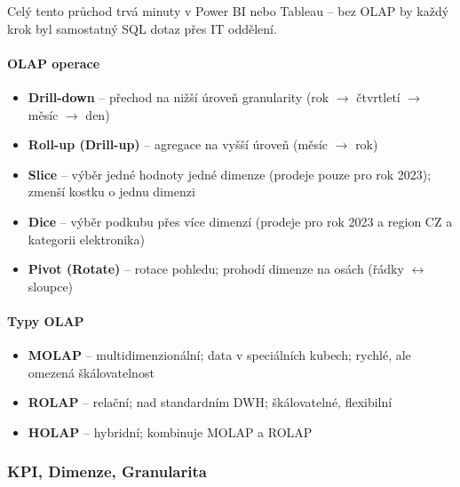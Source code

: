 Celý tento průchod trvá minuty v Power BI nebo Tableau -- bez OLAP by každý krok byl
samostatný SQL dotaz přes IT oddělení.

\paragraph{OLAP operace}
\begin{itemize}
  \item \textbf{Drill-down} -- přechod na nižší úroveň granularity (rok $\to$ čtvrtletí $\to$ měsíc $\to$ den)
  \item \textbf{Roll-up (Drill-up)} -- agregace na vyšší úroveň (měsíc $\to$ rok)
  \item \textbf{Slice} -- výběr jedné hodnoty jedné dimenze (prodeje pouze pro rok 2023); zmenší kostku o jednu dimenzi
  \item \textbf{Dice} -- výběr podkubu přes více dimenzí (prodeje pro rok 2023 a region CZ a kategorii elektronika)
  \item \textbf{Pivot (Rotate)} -- rotace pohledu; prohodí dimenze na osách (řádky $\leftrightarrow$ sloupce)
\end{itemize}

\paragraph{Typy OLAP}
\begin{itemize}
  \item \textbf{MOLAP} -- multidimenzionální; data v speciálních kubech; rychlé, ale omezená škálovatelnost
  \item \textbf{ROLAP} -- relační; nad standardním DWH; škálovatelné, flexibilní
  \item \textbf{HOLAP} -- hybridní; kombinuje MOLAP a ROLAP
\end{itemize}

\subsubsection{KPI, Dimenze, Granularita}

